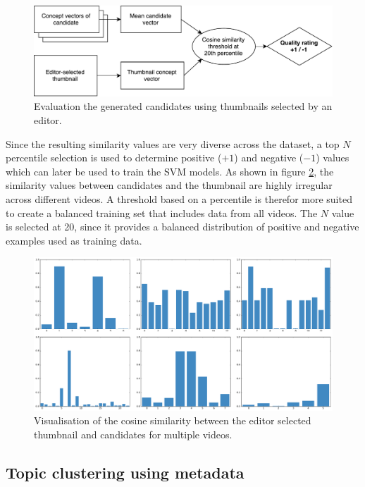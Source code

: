 \documentclass{../resources/sig-alternate-05-2015}
\begin{document}
\begin{figure}[h]
  \includegraphics[width=\linewidth]{resources/candidate-evaluation}
  \caption{Evaluation the generated candidates using thumbnails selected by an editor.}
  \label{figure: candidate evaluation scheme}
\end{figure}

Since the resulting similarity values are very diverse across the dataset, a top $N$ percentile selection is used to determine positive ($+1$) and negative ($-1$) values which can later be used to train the SVM models. As shown in figure \ref{figure: thumbnail similarity}, the similarity values between candidates and the thumbnail are highly irregular across different videos. A threshold based on a percentile is therefor more suited to create a balanced training set that includes data from all videos. The $N$ value is selected at 20, since it provides a balanced distribution of positive and negative examples used as training data.

\begin{figure}[h]
  \includegraphics[width=\linewidth]{resources/candidate-similarity.png}
  \caption{Visualisation of the cosine similarity between the editor selected thumbnail and candidates for multiple videos.}
  \label{figure: thumbnail similarity}
\end{figure}


\subsection{Topic clustering using metadata}
\label{topic clustering}
\end{document}
